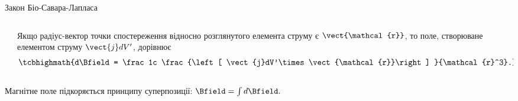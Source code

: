 \documentclass{beamer}
\begin{document}
\begin{frame}{Закон Біо-Савара-Лапласа}{}
\begin{columns}
\begin{column}{0.4\linewidth}
\begin{tikzpicture}[>=latex]
			\end{tikzpicture}
		\end{column}
		\begin{column}{0.6\linewidth}
			\begin{block}{}\justifying
				Якщо радіус-вектор точки спостереження відносно розглянутого елемента струму є $\vect{\mathcal{r}}$, то поле,
				створюване елементом струму $\vect{j} dV'$, дорівнює
				\begin{equation*}
					\tcbhighmath{d\Bfield = \frac1c \frac{\left[ \vect{j}dV'\times\vect{\mathcal{r}}\right] }{\mathcal{r}^3}.}
				\end{equation*}
			\end{block}
		\end{column}
	\end{columns}
	\begin{alertblock}{}
		Магнітне поле підкоряється принципу суперпозиції:
		\(
		\Bfield = \int d\Bfield.
		\)
	\end{alertblock}
\end{frame}
\end{document}
